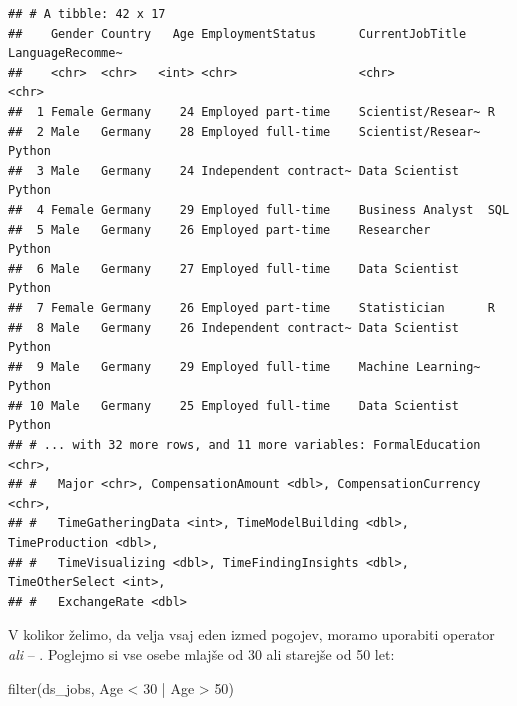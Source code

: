 \documentclass[
]{book}
\newenvironment{Shaded}{\begin{snugshade}}{\end{snugshade}}
\newcommand{\DecValTok}[1]{\textcolor[rgb]{0.00,0.00,0.81}{#1}}
\newcommand{\FunctionTok}[1]{\textcolor[rgb]{0.00,0.00,0.00}{#1}}
\newcommand{\NormalTok}[1]{#1}
\newcommand{\SpecialCharTok}[1]{\textcolor[rgb]{0.00,0.00,0.00}{#1}}
\begin{document}
\begin{verbatim}
## # A tibble: 42 x 17
##    Gender Country   Age EmploymentStatus      CurrentJobTitle   LanguageRecomme~
##    <chr>  <chr>   <int> <chr>                 <chr>             <chr>           
##  1 Female Germany    24 Employed part-time    Scientist/Resear~ R               
##  2 Male   Germany    28 Employed full-time    Scientist/Resear~ Python          
##  3 Male   Germany    24 Independent contract~ Data Scientist    Python          
##  4 Female Germany    29 Employed full-time    Business Analyst  SQL             
##  5 Male   Germany    26 Employed part-time    Researcher        Python          
##  6 Male   Germany    27 Employed full-time    Data Scientist    Python          
##  7 Female Germany    26 Employed part-time    Statistician      R               
##  8 Male   Germany    26 Independent contract~ Data Scientist    Python          
##  9 Male   Germany    29 Employed full-time    Machine Learning~ Python          
## 10 Male   Germany    25 Employed full-time    Data Scientist    Python          
## # ... with 32 more rows, and 11 more variables: FormalEducation <chr>,
## #   Major <chr>, CompensationAmount <dbl>, CompensationCurrency <chr>,
## #   TimeGatheringData <int>, TimeModelBuilding <dbl>, TimeProduction <dbl>,
## #   TimeVisualizing <dbl>, TimeFindingInsights <dbl>, TimeOtherSelect <int>,
## #   ExchangeRate <dbl>
\end{verbatim}

V kolikor želimo, da velja vsaj eden izmed pogojev, moramo uporabiti operator \emph{ali} -- \texttt{\textbar{}}. Poglejmo si vse osebe mlajše od 30 ali starejše od 50 let:

\begin{Shaded}
\begin{Highlighting}[]
\FunctionTok{filter}\NormalTok{(ds\_jobs, Age }\SpecialCharTok{\textless{}} \DecValTok{30} \SpecialCharTok{|}\NormalTok{ Age }\SpecialCharTok{\textgreater{}} \DecValTok{50}\NormalTok{)}
\end{Highlighting}
\end{Shaded}
\end{document}
